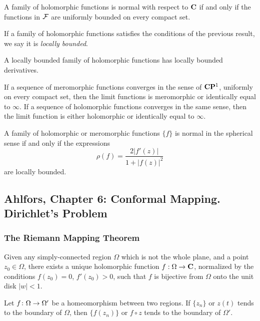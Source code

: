 \begin{theorem}
  A family of holomorphic functions is normal with respect to $\mathbf{C}$ if and only if the functions in $\mathcal{F}$ are uniformly bounded on every compact set.
\end{theorem}

If a family of holomorphic functions satisfies the conditions of the previous result, we say it is \emph{locally bounded}.

\begin{theorem}
  A locally bounded family of holomorphic functions has locally bounded derivatives.
\end{theorem}

\begin{lemma}
  If a sequence of meromorphic functions converges in the sense of $\mathbf{C}\mathbf{P}^1$, uniformly on every compact set, then the limit functions is meromorphic or identically equal to $\infty$. If a sequence of holomorphic functions converges in the same sense, then the limit function is either holomorphic or identically equal to $\infty$.
\end{lemma}

\begin{theorem}
  A family of holomorphic or meromorphic functions $\{f\}$ is normal in the spherical sense if and only if the expressions
  \[
  \rho(f) = \frac{2|f'(z)|}{1+|f(z)|^2}
  \]
  are locally bounded.
\end{theorem}

\subsection{Ahlfors, Chapter 6: Conformal Mapping. Dirichlet's Problem}

\subsubsection{The Riemann Mapping Theorem}

\begin{theorem}
  Given any simply-connected  region $\Omega$ which is not the whole plane, and a point $z_0 \in \Omega$, there exists a unique holomorphic function $f : \Omega \rightarrow \mathbf{C}$, normalized by the conditions $f(z_0) = 0$, $f'(z_0) > 0$, such that $f$ is bijective from $\Omega$ onto the unit disk $|w| < 1$.  
\end{theorem}

\begin{theorem}
  Let $f \colon \Omega \rightarrow \Omega'$ be a homeomorphism between two regions. If $\{z_n\}$ or $z(t)$ tends to the boundary of $\Omega$, then $\{f(z_n)\}$ or $f \circ z$ tends to the boundary of $\Omega'$.
\end{theorem}

